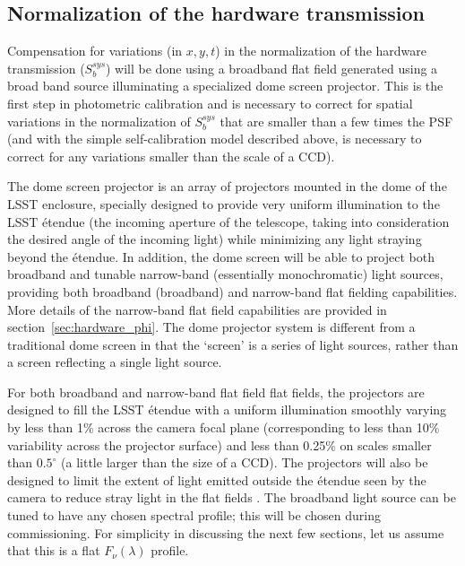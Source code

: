 \documentclass[12pt,preprint]{aastex}
\begin{document}
\subsection{Normalization of the hardware transmission}
\label{sec:hardware_norm}

Compensation for variations (in $x,y,t$) in the normalization of the
hardware transmission ($S_b^{sys}$) will be done using a broadband
flat field generated using a broad band source illuminating a
specialized dome screen projector. This is the first step in
photometric calibration and is necessary to correct for spatial variations in
the normalization of $S_b^{sys}$ that are smaller than a few times the
PSF (and with the simple self-calibration model described above, is
necessary to correct for any variations smaller than the scale of a
CCD).

The dome screen projector is an array of projectors mounted in the
dome of the LSST enclosure, specially designed to provide very uniform
illumination to the LSST \'{e}tendue (the incoming aperture of the
telescope, taking into consideration the desired angle of the incoming
light) while minimizing any light straying beyond the \'{e}tendue. In
addition, the dome screen will be able to project both broadband and
tunable narrow-band (essentially monochromatic) light sources,
providing both broadband (broadband) and narrow-band flat fielding
capabilities.  More details of the narrow-band flat field capabilities
are provided in section~\ref{sec:hardware_phi}. The dome projector
system is different from a traditional dome screen in that the
`screen' is a series of light sources, rather than a screen reflecting
a single light source.

For both broadband and narrow-band flat field flat fields, the
projectors are designed to fill the LSST \'{e}tendue with a uniform
illumination smoothly varying by less than 1\% across the camera focal
plane (corresponding to less than 10\% variability across the
projector surface) and less than 0.25\% on scales smaller than
$0.5^{\circ}$ (a little larger than the size of a CCD). The projectors
will also be designed to limit the extent of light emitted outside the
\'{e}tendue seen by the camera to reduce stray light in the flat
fields \citep{Gressler2010}. The broadband light source can be tuned
to have any chosen spectral profile; this will be chosen during
commissioning. For simplicity in discussing the next few sections, let
us assume that this is a flat $F_\nu(\lambda)$ profile.
\end{document}
